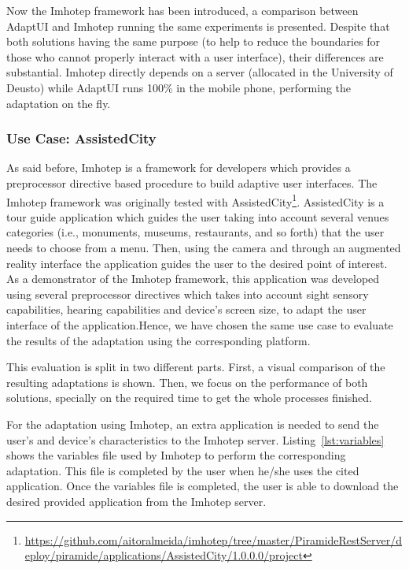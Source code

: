 Now the Imhotep framework has been introduced, a comparison between AdaptUI and
Imhotep running the same experiments is presented. Despite that both solutions
having the same purpose (to help to reduce the boundaries for those who cannot
properly interact with a user interface), their differences are substantial.
Imhotep directly depends on a server (allocated in the University of Deusto)
while AdaptUI runs 100\% in the mobile phone, performing the adaptation on the
fly. 

\subsubsection{Use Case: AssistedCity}
\label{sec:assisted_city_use_case}

As said before, Imhotep is a framework for developers which provides a 
preprocessor directive based procedure to build adaptive user interfaces. The 
Imhotep framework was originally tested with AssistedCity\footnote{\url{
https://github.com/aitoralmeida/imhotep/tree/master/PiramideRestServer/deploy/piramide/applications/AssistedCity/1.0.0.0/project}}. 
AssistedCity is a tour 
guide application which guides the user taking into account several venues 
categories (i.e., monuments, museums, restaurants, and so forth) that the user 
needs to choose from a menu. Then, using the camera and through an augmented 
reality interface the application guides the user to the desired point of 
interest. As a demonstrator of the Imhotep framework, this application was 
developed using several preprocessor directives which takes into account sight 
sensory capabilities, hearing capabilities and device's screen size, to adapt 
the user interface of the application.Hence, we have chosen the same use case to 
evaluate the results of the adaptation using the corresponding platform.

This evaluation is split in two different parts. First, a visual comparison of
the resulting adaptations is shown. Then, we focus on the performance of both
solutions, specially on the required time to get the whole processes finished.

For the adaptation using Imhotep, an extra application is needed to send the 
user's and device's characteristics to the Imhotep server. 
Listing~\ref{lst:variables} shows the variables file used by Imhotep to perform
the corresponding adaptation. This file is completed by the user when he/she 
uses the cited application. Once the variables file is completed, the user is 
able to download the desired provided application from the Imhotep server.


